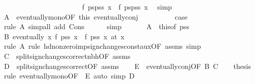 \begin{isabellebody}
\ \ \ \ \ \ \ \ \ \ \ \ \ \ \ \ \ \ \ \ \ \ {\isasymlongrightarrow}\ {\isacharquery}f\ {\isacharparenleft}ps{\isacharprime}{\isacharhash}pss{\isacharparenright}\ x\ {\isacharequal}\ {\isacharquery}f\ {\isacharparenleft}ps{\isacharprime}{\isacharhash}pss{\isacharparenright}\ x\ \isamarkupfalse%
\ simp\isanewline
\ \ \ \ \ \ \ \ \isamarkupfalse%
\ A\ {\isacharequal}\ eventually{\isacharunderscore}mono{\isacharbrackleft}OF\ this\ eventually{\isacharunderscore}conj{\isacharbrackright}\isanewline
\ \ \ \ \ \ \ \ \isamarkupfalse%
\ {\isacharquery}case\ \isamarkupfalse%
\ {\isacharparenleft}rule\ A{\isacharcomma}\ simp{\isacharunderscore}all\ add{\isacharcolon}\ Cons{\isacharparenright}\isanewline
\ \ \ \ \isamarkupfalse%
\ simp\isanewline
\ \ \isacommand{{\isacharbraceright}}\isamarkupfalse%
\isanewline
\ \ \isamarkupfalse%
\ A\ {\isacharequal}\ this{\isacharbrackleft}of\ {\isacharquery}pss{\isacharbrackright}\isanewline
\ \ \isamarkupfalse%
\ B{\isacharcolon}\ {\isachardoublequoteopen}eventually\ {\isacharparenleft}{\isasymlambda}x{\isachardot}\ {\isacharquery}f\ {\isacharquery}pss\ x\ {\isacharequal}\ {\isacharquery}f\ {\isacharquery}pss\ x\ {\isacharparenleft}at\ x\isanewline
\ \ \ \ \ \ \isamarkupfalse%
\ {\isacharparenleft}rule\ A{\isacharcomma}\ rule\ hd{\isacharunderscore}nonzero{\isacharunderscore}imp{\isacharunderscore}sign{\isacharunderscore}changes{\isacharunderscore}const{\isacharunderscore}aux{\isacharbrackleft}OF\ assms{\isacharbrackright}{\isacharcomma}\ simp{\isacharparenright}\isanewline
\ \ \isamarkupfalse%
\ C\ {\isacharequal}\ split{\isacharunderscore}sign{\isacharunderscore}changes{\isacharunderscore}correct{\isacharunderscore}nbh{\isacharbrackleft}OF\ assms{\isacharbrackright}\isanewline
\ \ \isamarkupfalse%
\ D\ {\isacharequal}\ split{\isacharunderscore}sign{\isacharunderscore}changes{\isacharunderscore}correct{\isacharbrackleft}OF\ assms{\isacharbrackright}\isanewline
\ \ \isamarkupfalse%
\ E\ {\isacharequal}\ eventually{\isacharunderscore}conj{\isacharbrackleft}OF\ B\ C{\isacharbrackright}\isanewline
\ \ \isamarkupfalse%
\ {\isacharquery}thesis\ \isamarkupfalse%
\ {\isacharparenleft}rule\ eventually{\isacharunderscore}mono{\isacharbrackleft}OF\ {\isacharunderscore}\ E{\isacharbrackright}{\isacharcomma}\ auto\ simp{\isacharcolon}\ D{\isacharparenright}\isanewline

\end{isabellebody}
